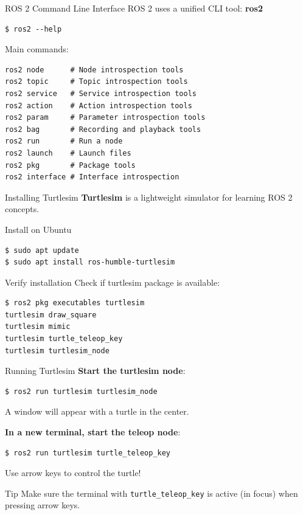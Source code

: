 \begin{frame}[fragile]{ROS 2 Command Line Interface}
    ROS 2 uses a unified CLI tool: \textbf{ros2}

    \begin{lstlisting}[language=shell]
$ ros2 --help
\end{lstlisting}

    Main commands:
    \begin{lstlisting}[language=syntax]
ros2 node      # Node introspection tools
ros2 topic     # Topic introspection tools
ros2 service   # Service introspection tools
ros2 action    # Action introspection tools
ros2 param     # Parameter introspection tools
ros2 bag       # Recording and playback tools
ros2 run       # Run a node
ros2 launch    # Launch files
ros2 pkg       # Package tools
ros2 interface # Interface introspection
\end{lstlisting}
\end{frame}

\begin{frame}[fragile]{Installing Turtlesim}
    \textbf{Turtlesim} is a lightweight simulator for learning ROS 2 concepts.

    \begin{block}{Install on Ubuntu}
        \begin{lstlisting}[language=shell]
$ sudo apt update
$ sudo apt install ros-humble-turtlesim
\end{lstlisting}
    \end{block}

    \begin{block}{Verify installation}
        Check if turtlesim package is available:
        \begin{lstlisting}[language=shell]
$ ros2 pkg executables turtlesim
turtlesim draw_square
turtlesim mimic
turtlesim turtle_teleop_key
turtlesim turtlesim_node
\end{lstlisting}
    \end{block}
\end{frame}

\begin{frame}[fragile]{Running Turtlesim}
    \textbf{Start the turtlesim node}:
    \begin{lstlisting}[language=shell]
$ ros2 run turtlesim turtlesim_node
\end{lstlisting}

    A window will appear with a turtle in the center.

    \vspace{0.5cm}

    \textbf{In a new terminal, start the teleop node}:
    \begin{lstlisting}[language=shell]
$ ros2 run turtlesim turtle_teleop_key
\end{lstlisting}

    Use arrow keys to control the turtle!

    \begin{alertblock}{Tip}
        Make sure the terminal with \texttt{turtle\_teleop\_key} is active (in focus) when pressing arrow keys.
    \end{alertblock}
\end{frame}

